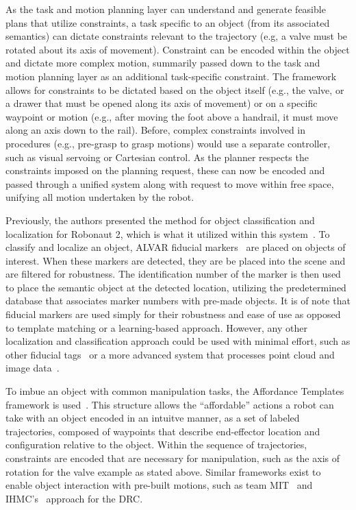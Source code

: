 As the task and motion planning layer can understand and generate feasible plans that utilize constraints, a task specific to an object (from its associated semantics) can dictate constraints relevant to the trajectory (e.g, a valve must be rotated about its axis of movement).
Constraint can be encoded within the object and dictate more complex motion, summarily passed down to the task and motion planning layer as an additional task-specific constraint.
The framework allows for constraints to be dictated based on the object itself (e.g., the valve, or a drawer that must be opened along its axis of movement) or on a specific waypoint or motion (e.g., after moving the foot above a handrail, it must move along an axis down to the rail).
Before, complex constraints involved in procedures (e.g., pre-grasp to grasp motions) would use a separate controller, such as visual servoing or Cartesian control.
As the planner respects the constraints imposed on the planning request, these can now be encoded and passed through a unified system along with request to move within free space, unifying all motion undertaken by the robot.

Previously, the authors presented the method for object classification and localization for Robonaut 2, which is what it utilized within this system~\cite{farrell2017}.
To classify and localize an object, ALVAR fiducial markers~\cite{ar_track_alvar} are placed on objects of interest.
When these markers are detected, they are be placed into the scene and are filtered for robustness.
The identification number of the marker is then used to place the semantic object at the detected location, utilizing the predetermined database that associates marker numbers with pre-made objects.
It is of note that fiducial markers are used simply for their robustness and ease of use as opposed to template matching or a learning-based approach.
However, any other localization and classification approach could be used with minimal effort, such as other fiducial tags~\cite{olson2011apriltag} or a more advanced system that processes point cloud and image data~\cite{Quigley2009}.

To imbue an object with common manipulation tasks, the Affordance Templates framework is used~\cite{Hart2015}.
This structure allows the ``affordable'' actions a robot can take with an object encoded in an intuitve manner, as a set of labeled trajectories, composed of waypoints that describe end-effector location and configuration relative to the object.
Within the sequence of trajectories, constraints are encoded that are necessary for manipulation, such as the axis of rotation for the valve example as stated above.
Similar frameworks exist to enable object interaction with pre-built motions, such as team MIT~\cite{fallon2014affordance} and IHMC's~\cite{koolen2013summary} approach for the DRC.

